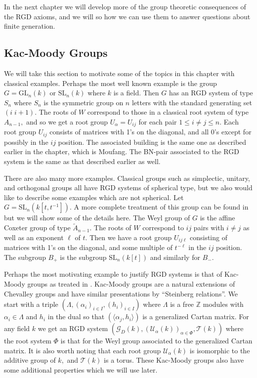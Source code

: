 \documentclass[class=book, crop=false,12 pt]{standalone}
\begin{document}
In the next chapter we will develop more of the group theoretic consequences of the RGD axioms, and we will so how we can use them to answer questions about finite generation.

\subsection{Kac-Moody Groups}
We will take this section to motivate some of the topics in this chapter with classical examples. Perhaps the most well known example is the group $G=\mathrm{GL}_n(k)$ or $\mathrm{SL}_n(k)$ where $k$ is a field. Then $G$ has an RGD system of type $S_n$ where $S_n$ is the symmetric group on $n$ letters with the standard generating set $(i\;i+1).$ The roots of $W$ correspond to those in a classical root system of type $A_{n-1},$ and so we get a root group $U_\alpha=U_{ij}$ for each pair $1\le i\neq j\le n.$ Each root group $U_{ij}$ consists of matrices with 1's on the diagonal, and all 0's except for possibly in the $ij$ position. The associated building is the same one as described earlier in the chapter, which is Moufang. The BN-pair associated to the RGD system is the same as that described earlier as well.

There are also many more examples. Classical groups such as simplectic, unitary, and orthogonal groups all have RGD systems of spherical type, but we also would like to describe some examples which are not spherical. Let $G=\mathrm{SL}_n(k[t,t^{-1}]).$ A more complete treatment of this group can be found in \cite{sarith} but we will show some of the details here. The Weyl group of $G$ is the affine Coxeter group of type $\tilde{A}_{n-1}.$ The roots of $W$ correspond to $ij$ pairs with $i\neq j$ as well as an exponent $\ell$ of $t.$ Then we have a root group $U_{ij\ell}$ consisting of matrices with 1's on the diagonal, and some multiple of $t^{-\ell}$ in the $ij$ position. The subgroup $B_+$ is the subgroup $\mathrm{SL}_n(k[t])$ and similarly for $B_-.$ 

Perhaps the most motivating example to justify RGD systems is that of Kac-Moody groups as treated in \cite{kacmoody}. Kac-Moody groups are a natural extensions of Chevalley groups and have similar presentations by ``Steinberg relations''. We start with a triple $(\Lambda,(\alpha_i)_{i\in I},(h_i)_{i\in I})$ where $\Lambda$ is a free $\mathbb{Z}$ modules with $\alpha_i\in \Lambda$ and $h_i$ in the dual so that $(\langle \alpha_j,h_i\rangle)$ is a generalized Cartan matrix. For any field $k$ we get an RGD system $(\mathcal{G}_D(k),(\mathcal{U}_\alpha(k))_{\alpha\in \Phi},\mathcal{T}(k))$ where the root system $\Phi$ is that for the Weyl group associated to the generalized Cartan matrix. It is also worth noting that each root group $\mathcal{U}_\alpha(k)$ is isomorphic to the additive group of $k,$ and $\mathcal{T}(k)$ is a torus. These Kac-Moody groups also have some additional properties which we will use later.
\end{document}
